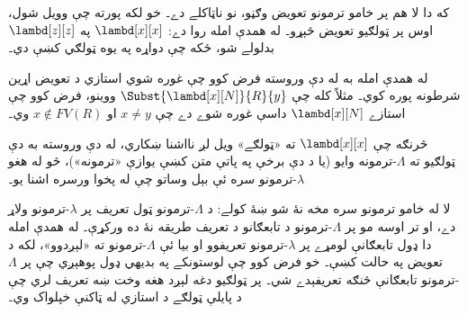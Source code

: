 \documentclass[../../../include/open-logic-section]{subfiles}
\begin{document}
که دا لا هم پر خامو ترمونو تعويض وګڼو، نو 
ناټاکلے دے۔ خو لکه پورته چې وويل شول، اوس پر ټولګيو
تعويض څېړو۔ له همدې امله  روا دے:
$\lambd[x][x]$ په $\lambd[z][z]$ بدلولے شو، ځکه چې
دواړه په يوه ټولګي کښې دي۔

له همدې امله به له دې وروسته فرض کوو چې غوره شوي
استازي د تعويض اړين شرطونه پوره کوي۔ مثلاً کله چې
$\Subst{\lambd[x][N]}{R}{y}$ ووينو، فرض کوو چې
استازے $\lambd[x][N]$ داسې غوره شوے دے چې
$x \neq y$ او $x \notin FV(R)$ وي۔

څرنګه چې $\lambd[x][x]$ ته «ټولګے» ويل لږ نااشنا ښکاري،
له دې وروسته به دې ټولګيو ته $\Lambda$-ترمونه وايو
(يا د دې برخې په پاتې متن کښې يوازې «ترمونه»)، څو
له هغو $\lambda$-ترمونو سره ئې بېل وساتو چې له پخوا
ورسره اشنا يو۔

\begin{editorial}
  لا له خامو ترمونو سره مخه نۀ شو ښۀ کولے: د
  $\Lambda$-ترمونو ټول تعريف پر $\lambda$-ترمونو ولاړ دے،
  او تر اوسه مو پر $\Lambda$-ترمونو د تابعګانو د تعريف
  طريقه نۀ ده ورکړې۔ له همدې امله دا ډول تابعګانې
  لومړے پر $\lambda$-ترمونو تعريفوو او بيا ئې
  $\Lambda$-ترمونو ته «لېږدوو»، لکه د تعويض په حالت کښې۔
  خو فرض کوو چې لوستونکے په بديهي ډول پوهېږي چې پر
  $\Lambda$-ترمونو تابعګانې څنګه تعريفېدے شي۔
  پر ټولګيو دغه لېږد هغه وخت ښه تعريف لري چې د پايلې ټولګے
  د استازي له ټاکنې خپلواک وي۔
\end{editorial}
\end{document}
